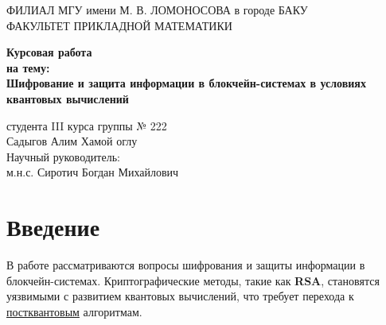 \documentclass[a4paper]{article}
\begin{document}
\begin{titlepage}
    \centering
    {\small
    ФИЛИАЛ МГУ имени М. В. ЛОМОНОСОВА в городе БАКУ\\
    ФАКУЛЬТЕТ ПРИКЛАДНОЙ МАТЕМАТИКИ \\} 
    \vfill

    {\Large\textbf{Курсовая работа}}\\[1em]
    {\large\textbf{на тему:}}\\
    \textbf{Шифрование и защита информации в блокчейн-системах в условиях квантовых вычислений}

    \vfill

    \begin{flushright}
    студента III курса группы № 222\\
    Садыгов Алим Хамой оглу\\[1em]
    Научный руководитель:\\
    м.н.с. Сиротич Богдан Михайлович
\end{flushright}

    \vfill
\end{titlepage}

\tableofcontents
\newpage


\section{Введение}
В работе рассматриваются вопросы шифрования и защиты информации в блокчейн-системах. 
Криптографические методы, такие как \textbf{RSA}, становятся уязвимыми с развитием квантовых вычислений, 
что требует перехода к \underline{постквантовым} алгоритмам.
\end{document}
